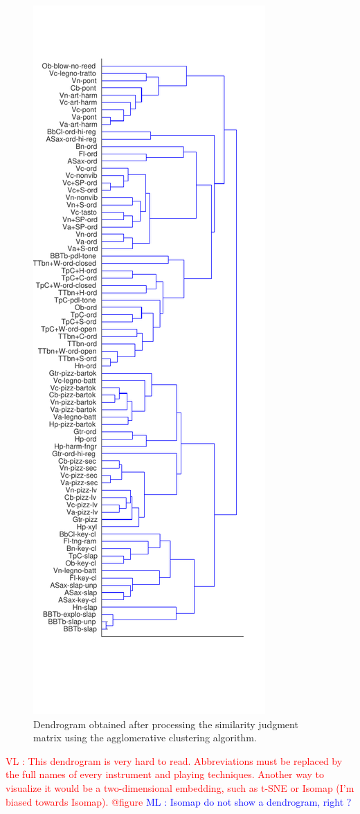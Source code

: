 \documentclass{article}
\newcommand{\ml}[1]{\textcolor{blue}{ML : #1}}
\newcommand{\vl}[1]{\textcolor{red}{VL : #1}}
\begin{document}
\begin{figure}
\center
\includegraphics[width = \textwidth]{figures/dendrogram.pdf}
\caption{Dendrogram obtained after processing the similarity judgment matrix using the agglomerative clustering algorithm.}
\label{fig:dendrogram}
\end{figure}

\vl{This dendrogram is very hard to read. Abbreviations must be replaced by the full names of every instrument and playing techniques.
Another way to visualize it would be a two-dimensional embedding, such as t-SNE or Isomap (I'm biased towards Isomap). @figure}
\ml{Isomap do not show a dendrogram, right ?}
\end{document}
